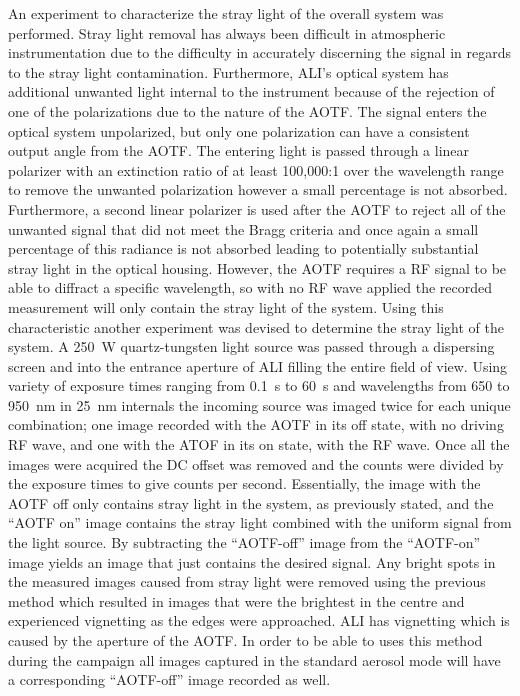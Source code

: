 \documentclass[12pt]{article}
\begin{document}
An experiment to characterize the stray light of the overall system was performed. Stray light removal has always been difficult in atmospheric instrumentation due to the difficulty in accurately discerning the signal in regards to the stray light contamination. Furthermore, ALI's optical system has additional unwanted light internal to the instrument because of the rejection of one of the polarizations due to the nature of the AOTF. The signal enters the optical system unpolarized, but only one polarization can have a consistent output angle from the AOTF. The entering light is passed through a linear polarizer with an extinction ratio of at least 100,000:1 over the wavelength range to remove the unwanted polarization however a small percentage is not absorbed. Furthermore, a second linear polarizer is used after the AOTF to reject all of the unwanted signal that did not meet the Bragg criteria and once again a small percentage of this radiance is not absorbed leading to potentially substantial stray light in the optical housing. However, the AOTF requires a RF signal to be able to diffract a specific wavelength, so with no RF wave applied the recorded measurement will only contain the stray light of the system. Using this characteristic another experiment was devised to determine the stray light of the system. A 250~W quartz-tungsten light source was passed through a dispersing screen and into the entrance aperture of ALI filling the entire field of view. Using variety of exposure times ranging from 0.1~s to 60~s and wavelengths from 650 to 950~nm in 25~nm internals the incoming source was imaged twice for each unique combination; one image recorded with the AOTF in its off state, with no driving RF wave, and one with the ATOF in its on state, with the RF wave. Once all the images were acquired the DC offset was removed and the counts were divided by the exposure times to give counts per second. Essentially, the image with the AOTF off only contains stray light in the system, as previously stated, and the ``AOTF on'' image contains the stray light combined with the uniform signal from the light source. By subtracting the ``AOTF-off'' image from the ``AOTF-on'' image yields an image that just contains the desired signal. Any bright spots in the measured images caused from stray light were removed using the previous method which resulted in images that were the brightest in the centre and experienced vignetting as the edges were approached. ALI has vignetting which is caused by the aperture of the AOTF. In order to be able to uses this method during the campaign all images captured in the standard aerosol mode will have a corresponding ``AOTF-off'' image recorded as well.
\end{document}
